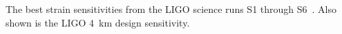 \label{figure:LIGOstrains}
The best strain sensitivities from the LIGO science runs S1
through S6~\cite{LIGOcurves}. Also shown is the LIGO 4~km design sensitivity.
